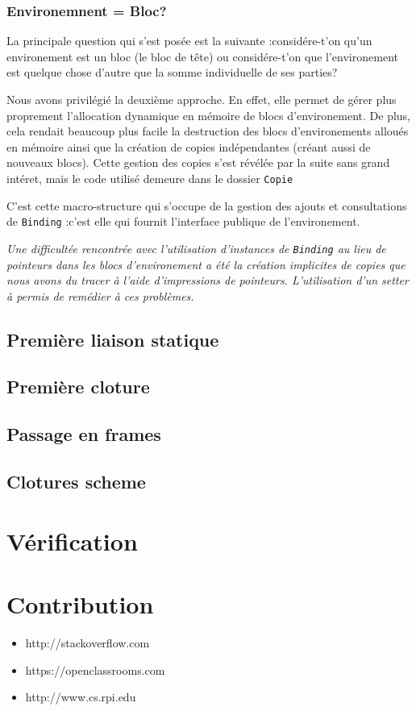 \documentclass[a4paper,11pt]{article}
\newcommand{\dbend}{{\manual\char127}}
\newenvironment{attention}%
{\description\item[\dbend]\sl}%
{\enddescription}
\begin{document}
\subsubsection{Environemnent = Bloc?}

La principale question qui s'est posée est la suivante :considére-t'on qu'un
environement est un bloc (le bloc de \og tête\fg) ou considére-t'on que
l'environement est quelque chose d'autre que la somme individuelle de ses
parties?

Nous avons privilégié la deuxième approche. En effet, elle permet de gérer plus
proprement l'allocation dynamique en mémoire de blocs d'environement. De plus,
cela rendait beaucoup plus facile la destruction des blocs d'environements
alloués en mémoire ainsi que la création de copies indépendantes (créant aussi
de nouveaux blocs). Cette gestion des copies s'est révélée par la suite sans
grand intéret, mais le code utilisé demeure dans le dossier \texttt{Copie}

C'est cette macro-structure qui s'occupe de la gestion des ajouts et
consultations de \texttt{Binding} :c'est elle qui fournit l'interface publique
de l'environement.

\begin{attention}
  Une difficultée rencontrée avec l'utilisation d'instances de \texttt{Binding}
  au lieu de pointeurs dans les blocs d'environement a été la création
  implicites de copies que nous avons du tracer à l'aide d'impressions de
  pointeurs. L'utilisation d'un setter à permis de remédier à ces problèmes.
\end{attention}

\subsection{Première liaison statique}

\subsection{Première cloture}

\subsection{Passage en frames}

\subsection{Clotures scheme}

\section{Vérification}

\section{Contribution}




\begin{itemize}
\item http://stackoverflow.com
\item https://openclassrooms.com
\item http://www.cs.rpi.edu
\end{itemize}
\end{document}
